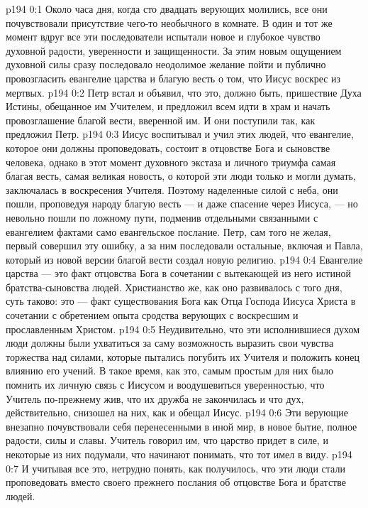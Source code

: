 \author{Комиссия срединников}
\vs p194 0:1 Около часа дня, когда сто двадцать верующих молились, все они почувствовали присутствие чего\hyp{}то необычного в комнате. В один и тот же момент вдруг все эти последователи испытали новое и глубокое чувство духовной радости, уверенности и защищенности. За этим новым ощущением духовной силы сразу последовало неодолимое желание пойти и публично провозгласить евангелие царства и благую весть о том, что Иисус воскрес из мертвых.
\vs p194 0:2 Петр встал и объявил, что это, должно быть, пришествие Духа Истины, обещанное им Учителем, и предложил всем идти в храм и начать провозглашение благой вести, вверенной им. И они поступили так, как предложил Петр.
\vs p194 0:3 \pc Иисус воспитывал и учил этих людей, что евангелие, которое они должны проповедовать, состоит в отцовстве Бога и сыновстве человека, однако в этот момент духовного экстаза и личного триумфа самая благая весть, самая великая новость, о которой эти люди только и могли думать, заключалась в  воскресения Учителя. Поэтому наделенные силой с неба, они пошли, проповедуя народу благую весть --- и даже спасение через Иисуса, --- но невольно пошли по ложному пути, подменив отдельными связанными с евангелием фактами само евангельское послание. Петр, сам того не желая, первый совершил эту ошибку, а за ним последовали остальные, включая и Павла, который из новой версии благой вести создал новую религию.
\vs p194 0:4 Евангелие царства --- это факт отцовства Бога в сочетании с вытекающей из него истиной братства\hyp{}сыновства людей. Христианство же, как оно развивалось с того дня, суть таково: это --- факт существования Бога как Отца Господа Иисуса Христа в сочетании с обретением опыта сродства верующих с воскресшим и прославленным Христом.
\vs p194 0:5 Неудивительно, что эти исполнившиеся духом люди должны были ухватиться за саму возможность выразить свои чувства торжества над силами, которые пытались погубить их Учителя и положить конец влиянию его учений. В такое время, как это, самым простым для них было помнить их личную связь с Иисусом и воодушевиться уверенностью, что Учитель по\hyp{}прежнему жив, что их дружба не закончилась и что дух, действительно, снизошел на них, как и обещал Иисус.
\vs p194 0:6 Эти верующие внезапно почувствовали себя перенесенными в иной мир, в новое бытие, полное радости, силы и славы. Учитель говорил им, что царство придет в силе, и некоторые из них подумали, что начинают понимать, что тот имел в виду.
\vs p194 0:7 И учитывая все это, нетрудно понять, как получилось, что эти люди стали проповедовать  вместо своего прежнего послания об отцовстве Бога и братстве людей.
